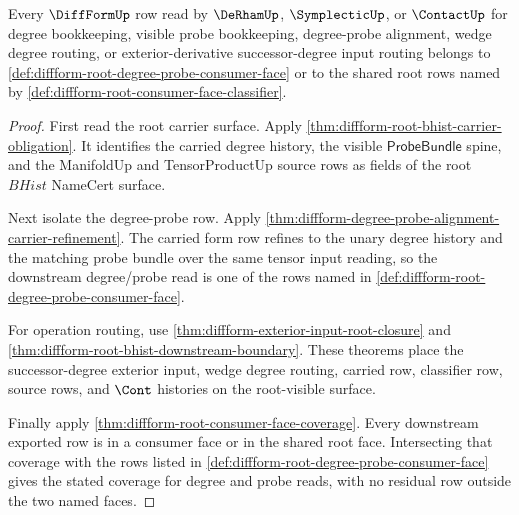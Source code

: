 \begin{theorem}
\label{thm:diffform-root-degree-probe-face-coverage}
Every $\DiffFormUp$ row read by $\DeRhamUp$, $\SymplecticUp$, or $\ContactUp$
for degree bookkeeping, visible probe bookkeeping, degree-probe alignment,
wedge degree routing, or exterior-derivative successor-degree input routing
belongs to \autoref{def:diffform-root-degree-probe-consumer-face} or to the
shared root rows named by
\autoref{def:diffform-root-consumer-face-classifier}.
\end{theorem}
\begin{proof}
First read the root carrier surface. Apply
\autoref{thm:diffform-root-bhist-carrier-obligation}. It identifies the carried
degree history, the visible $\mathsf{ProbeBundle}$ spine, and the ManifoldUp and
TensorProductUp source rows as fields of the root $BHist$ NameCert surface.

Next isolate the degree-probe row. Apply
\autoref{thm:diffform-degree-probe-alignment-carrier-refinement}. The carried
form row refines to the unary degree history and the matching probe bundle over
the same tensor input reading, so the downstream degree/probe read is one of
the rows named in
\autoref{def:diffform-root-degree-probe-consumer-face}.

For operation routing, use
\autoref{thm:diffform-exterior-input-root-closure} and
\autoref{thm:diffform-root-bhist-downstream-boundary}. These theorems place the
successor-degree exterior input, wedge degree routing, carried row, classifier
row, source rows, and $\Cont$ histories on the root-visible surface.

Finally apply \autoref{thm:diffform-root-consumer-face-coverage}. Every
downstream exported row is in a consumer face or in the shared root face.
Intersecting that coverage with the rows listed in
\autoref{def:diffform-root-degree-probe-consumer-face} gives the stated
coverage for degree and probe reads, with no residual row outside the two
named faces.
\end{proof}

